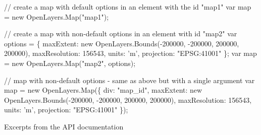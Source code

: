 \documentclass[]{article}
\newenvironment{Shaded}{}{}
\newcommand{\NormalTok}[1]{{#1}}
\begin{document}
\begin{Shaded}
\begin{Highlighting}[numbers=left,,]
    \NormalTok{// create a map with default options in an element with the id "map1"}
    \NormalTok{var map = new OpenLayers.Map("map1");}
    
    \NormalTok{// create a map with non-default options in an element with id "map2"}
    \NormalTok{var options = \{}
        \NormalTok{maxExtent: new OpenLayers.Bounds(-200000, -200000, 200000, 200000),}
        \NormalTok{maxResolution: 156543,}
        \NormalTok{units: 'm',}
        \NormalTok{projection: "EPSG:41001"}
    \NormalTok{\};}
    \NormalTok{var map = new OpenLayers.Map("map2", options);}
    
    \NormalTok{// map with non-default options - same as above but with a single argument}
    \NormalTok{var map = new OpenLayers.Map(\{}
        \NormalTok{div: "map_id",}
        \NormalTok{maxExtent: new OpenLayers.Bounds(-200000, -200000, 200000, 200000),}
        \NormalTok{maxResolution: 156543,}
        \NormalTok{units: 'm',}
        \NormalTok{projection: "EPSG:41001"}
    \NormalTok{\});}
\end{Highlighting}
\end{Shaded}

Excerpts from the API documentation
\end{document}
